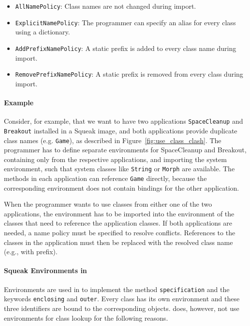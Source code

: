 \begin{itemize}
    \item \texttt{AllNamePolicy}: Class names are not changed during import.
    \item \texttt{ExplicitNamePolicy}: The programmer can specify an alias for every class using a dictionary.
    \item \texttt{AddPrefixNamePolicy}: A static prefix is added to every class name during import.
    \item \texttt{RemovePrefixNamePolicy}: A static prefix is removed from every class during import.
\end{itemize}

\paragraph{Example}
Consider, for example, that we want to have two applications \texttt{SpaceCleanup} and \texttt{Breakout} installed in a Squeak image, and both applications provide duplicate class names (e.g. \texttt{Game}), as described in Figure~\ref{fig:use_class_clash}. The programmer has to define separate environments for SpaceCleanup and Breakout, containing only from the respective applications, and importing the system environment, such that system classes like \texttt{String} or \texttt{Morph} are available. The methods in each application can reference \texttt{Game} directly, because the corresponding environment does not contain bindings for the other application.

When the programmer wants to use classes from either one of the two applications, the environment has to be imported into the environment of the classes that need to reference the application classes. If both applications are needed, a name policy must be specified to resolve conflicts. References to the classes in the application must then be replaced with the resolved class name (e.g., with prefix).

\paragraph{Squeak Environments in \msname}
Environments are used in \msname to implement the method \texttt{specification} and the keywords \texttt{enclosing} and \texttt{outer}. Every class has its own environment and these three identifiers are bound to the corresponding objects. \msname does, however, not use environments for class lookup for the following reasons.

